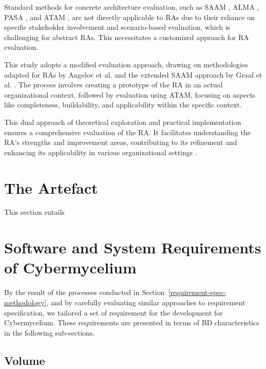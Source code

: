 \documentclass[review]{elsarticle}
\begin{document}
Standard methods for concrete architecture evaluation, such as SAAM \cite{kazman1994saam}, ALMA \cite{Bengtsson}, PASA \cite{Williams}, and ATAM \cite{KazmanATAM}, are not directly applicable to RAs due to their reliance on specific stakeholder involvement and scenario-based evaluation, which is challenging for abstract RAs. This necessitates a customized approach for RA evaluation.

This study adopts a modified evaluation approach, drawing on methodologies adapted for RAs by Angelov et al. \cite{angelov2008towards} and the extended SAAM approach by Graaf et al. \cite{graaf2005evaluating}. The process involves creating a prototype of the RA in an actual organizational context, followed by evaluation using ATAM, focusing on aspects like completeness, buildability, and applicability within the specific context.

This dual approach of theoretical exploration and practical implementation ensures a comprehensive evaluation of the RA. It facilitates understanding the RA's strengths and improvement areas, contributing to its refinement and enhancing its applicability in various organizational settings \cite{sharpe2019industrial, rohling2019reference, Nakagawa}.


\section{The Artefact}

This section entails 

\section{Software and System Requirements of Cybermycelium} \label{requirements-section}

By the result of the processes conducted in Section~\ref{requirement-spec-methodology}, and by carefully evaluating similar approaches to requirement specification, we tailored a set of requirement for the development for Cybermycelium. These requirements are presented in terms of BD characteristics in the following sub-sections.


\subsection{Volume}
\end{document}
